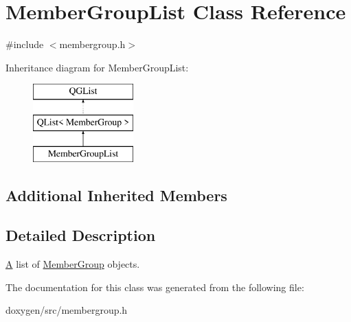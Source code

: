 \hypertarget{class_member_group_list}{}\section{Member\+Group\+List Class Reference}
\label{class_member_group_list}


{\ttfamily \#include $<$membergroup.\+h$>$}

Inheritance diagram for Member\+Group\+List\+:\begin{figure}[H]
\begin{center}
\leavevmode
\includegraphics[height=3.000000cm]{class_member_group_list}
\end{center}
\end{figure}
\subsection*{Additional Inherited Members}


\subsection{Detailed Description}
\mbox{\hyperlink{class_a}{A}} list of \mbox{\hyperlink{class_member_group}{Member\+Group}} objects. 

The documentation for this class was generated from the following file\+:\begin{DoxyCompactItemize}
\item 
doxygen/src/membergroup.\+h\end{DoxyCompactItemize}
